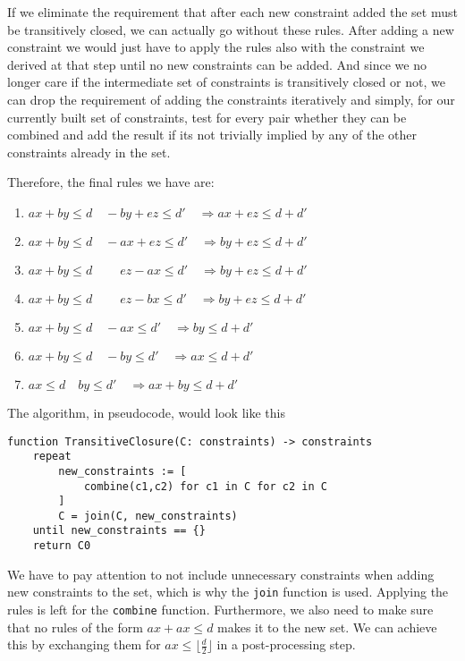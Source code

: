 
If we eliminate the requirement that after each new constraint added the set must be 
transitively closed, we can actually go without these rules. After adding a new 
constraint we would just have to apply the rules also with the constraint we derived at
that step until no new constraints can be added. And since we no longer care if the
intermediate set of constraints is transitively closed or not, we can drop the 
requirement of adding the constraints iteratively and simply, for our currently built
set of constraints, test for every pair whether they can be combined and add the 
result if its not trivially implied by any of the other constraints already in the 
set.

Therefore, the final rules we have are:
\begin{enumerate}[label={\small \boxed{\textbf{R{\arabic*}}}}]
    \item\label{rule:R1}
    $ax + by \le d \quad -by + ez \le d' \quad\Longrightarrow ax + ez \le d + d'$
    \item\label{rule:R2}
    $ax + by \le d \quad -ax + ez \le d' \quad\Longrightarrow by + ez \le d + d'$
    \item\label{rule:R3}
    $ax + by \le d \quad \phantom{-}ez - ax  \le d' \quad\Longrightarrow by + ez \le d + d'$
    \item\label{rule:R4}
    $ax + by \le d \quad \phantom{-}ez - bx  \le d' \quad\Longrightarrow by + ez \le d + d'$
    \item\label{rule:R5}
    $ax + by \le d \quad -ax \le d' \quad\Longrightarrow by \le d + d'$
    \item\label{rule:R6}
    $ax + by \le d \quad -by \le d' \quad\Longrightarrow ax \le d + d'$
    \item\label{rule:R7}
    $ax \le d \quad by \le d' \quad\Longrightarrow ax + by \le d + d'$
\end{enumerate}

The algorithm, in pseudocode, would look like this
\begin{verbatim}
function TransitiveClosure(C: constraints) -> constraints
    repeat
        new_constraints := [
            combine(c1,c2) for c1 in C for c2 in C
        ]
        C = join(C, new_constraints)
    until new_constraints == {}
    return C0
\end{verbatim}
\noindent We have to pay attention to not include unnecessary constraints when adding
new constraints to the set, which is why the \texttt{join} function is used.
Applying the rules is left for the \texttt{combine} function. Furthermore,
we also need to make sure that no rules of the form $ax + ax \le d$ makes it to the
new set. We can achieve this by exchanging them for $ax \le \lfloor\frac{d}{2}\rfloor$
in a post-processing step.


